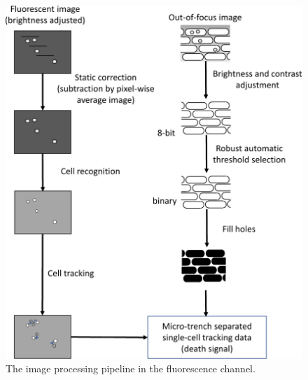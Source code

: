 \documentclass[pdftex,12pt,a4paper]{report}
\begin{document}
\begin{figure}[p]
   \centering
    \includegraphics[width=.95\textwidth]{images/pipeline/02-01.pdf}
    \caption[The image processing pipeline in the fluorescence channel]{The image processing pipeline in the  fluorescence channel.}
\end{figure}
\label{fig:pipeline21}
\end{document}

